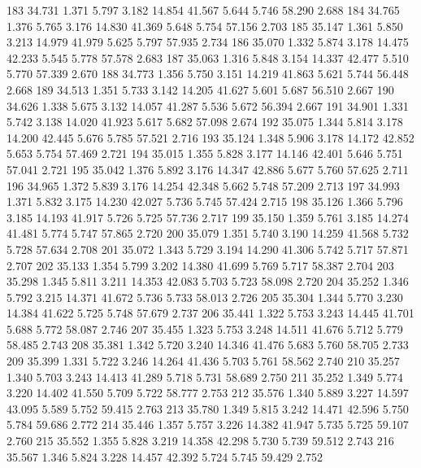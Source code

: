 \documentclass[a4paper,11pt]{scrartcl}
\begin{document}
\begin{Schunk}
\begin{Soutput}
183 34.731  1.371  5.797  3.182 14.854   41.567  5.644  5.746   58.290  2.688
184 34.765  1.376  5.765  3.176 14.830   41.369  5.648  5.754   57.156  2.703
185 35.147  1.361  5.850  3.213 14.979   41.979  5.625  5.797   57.935  2.734
186 35.070  1.332  5.874  3.178 14.475   42.233  5.545  5.778   57.578  2.683
187 35.063  1.316  5.848  3.154 14.337   42.477  5.510  5.770   57.339  2.670
188 34.773  1.356  5.750  3.151 14.219   41.863  5.621  5.744   56.448  2.668
189 34.513  1.351  5.733  3.142 14.205   41.627  5.601  5.687   56.510  2.667
190 34.626  1.338  5.675  3.132 14.057   41.287  5.536  5.672   56.394  2.667
191 34.901  1.331  5.742  3.138 14.020   41.923  5.617  5.682   57.098  2.674
192 35.075  1.344  5.814  3.178 14.200   42.445  5.676  5.785   57.521  2.716
193 35.124  1.348  5.906  3.178 14.172   42.852  5.653  5.754   57.469  2.721
194 35.015  1.355  5.828  3.177 14.146   42.401  5.646  5.751   57.041  2.721
195 35.042  1.376  5.892  3.176 14.347   42.886  5.677  5.760   57.625  2.711
196 34.965  1.372  5.839  3.176 14.254   42.348  5.662  5.748   57.209  2.713
197 34.993  1.371  5.832  3.175 14.230   42.027  5.736  5.745   57.424  2.715
198 35.126  1.366  5.796  3.185 14.193   41.917  5.726  5.725   57.736  2.717
199 35.150  1.359  5.761  3.185 14.274   41.481  5.774  5.747   57.865  2.720
200 35.079  1.351  5.740  3.190 14.259   41.568  5.732  5.728   57.634  2.708
201 35.072  1.343  5.729  3.194 14.290   41.306  5.742  5.717   57.871  2.707
202 35.133  1.354  5.799  3.202 14.380   41.699  5.769  5.717   58.387  2.704
203 35.298  1.345  5.811  3.211 14.353   42.083  5.703  5.723   58.098  2.720
204 35.252  1.346  5.792  3.215 14.371   41.672  5.736  5.733   58.013  2.726
205 35.304  1.344  5.770  3.230 14.384   41.622  5.725  5.748   57.679  2.737
206 35.441  1.322  5.753  3.243 14.445   41.701  5.688  5.772   58.087  2.746
207 35.455  1.323  5.753  3.248 14.511   41.676  5.712  5.779   58.485  2.743
208 35.381  1.342  5.720  3.240 14.346   41.476  5.683  5.760   58.705  2.733
209 35.399  1.331  5.722  3.246 14.264   41.436  5.703  5.761   58.562  2.740
210 35.257  1.340  5.703  3.243 14.413   41.289  5.718  5.731   58.689  2.750
211 35.252  1.349  5.774  3.220 14.402   41.550  5.709  5.722   58.777  2.753
212 35.576  1.340  5.889  3.227 14.597   43.095  5.589  5.752   59.415  2.763
213 35.780  1.349  5.815  3.242 14.471   42.596  5.750  5.784   59.686  2.772
214 35.446  1.357  5.757  3.226 14.382   41.947  5.735  5.725   59.107  2.760
215 35.552  1.355  5.828  3.219 14.358   42.298  5.730  5.739   59.512  2.743
216 35.567  1.346  5.824  3.228 14.457   42.392  5.724  5.745   59.429  2.752

\end{Soutput}
\end{Schunk}
\end{document}
